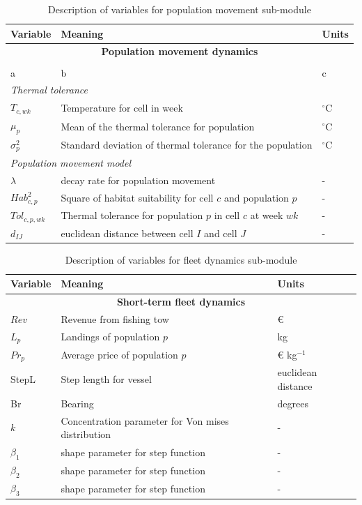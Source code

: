 \documentclass[review]{elsarticle}
\begin{document}
\begin{table}[!ht]
	\centering
	\caption{Description of variables for population movement sub-module}
	\begin{tabular}{p{1.5cm} p{8cm} p{1.5cm}}
		\toprule
		Variable & Meaning & Units \\
		\hline
		\multicolumn{3}{c}{\textbf{Population movement dynamics}} \\
		\hhline{===}
		\multicolumn{3}{l}{\textit{Habitat model}} \\
		\hline
		a & b & c \\
		\hline
		\multicolumn{3}{l}{\textit{Thermal tolerance}} \\
		\hline
		$T_{c,wk}$ & Temperature for cell in week & $^\circ$C \\
		$\mu_{p}$ & Mean of the thermal tolerance for population & $^\circ$C \\
		$\sigma^{2}_{p}$ & Standard deviation of thermal tolerance for
		the population & $^\circ$C \\
		\hline
		\multicolumn{3}{l}{\textit{Population movement model}} \\
		\hline
		$\lambda$ & decay rate for population movement & - \\
		$Hab^{2}_{c,p}$ & Square of habitat suitability for cell $c$ and
		population $p$ & - \\
		$Tol_{c,p,wk}$ & Thermal tolerance for population $p$ in cell
		$c$ at week $wk$ & - \\
		$d_{IJ}$ & euclidean distance between cell $I$ and cell $J$ & - \\
		\bottomrule
		\end{tabular}
	\end{table}

\begin{table}[!ht]
	\centering
	\caption{Description of variables for fleet dynamics sub-module}
	\begin{tabular}{p{1.5cm} p{8cm} p{1.5cm}}
		\toprule
		Variable & Meaning & Units \\
		\hline
		\multicolumn{3}{c}{\textbf{Short-term fleet dynamics}} \\
		\hhline{===}
		$Rev$ & Revenue from fishing tow & \euro \\
		$L_{p}$ & Landings of population $p$ & kg \\
		$Pr_{p}$ & Average price of population $p$ & \euro
		\hspace{0.1cm} kg$^{-1}$ \\
		StepL & Step length for vessel & euclidean distance \\
		Br & Bearing & degrees \\
		$k$ & Concentration parameter for Von mises distribution & - \\
		$\beta_{1}$ & shape parameter for step function & - \\
		$\beta_{2}$ & shape parameter for step function & - \\
		$\beta_{3}$ & shape parameter for step function & - \\
		\bottomrule
	\end{tabular}
\end{table}
\end{document}
